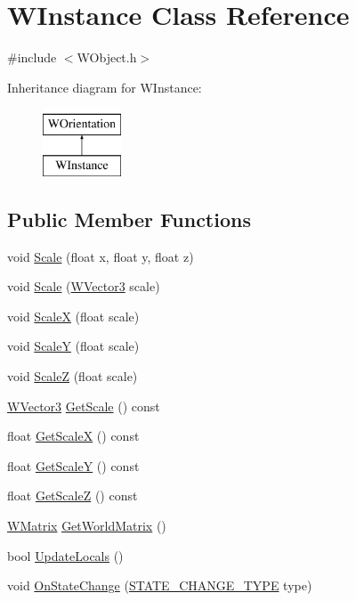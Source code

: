 \hypertarget{class_w_instance}{}\section{W\+Instance Class Reference}
\label{class_w_instance}


{\ttfamily \#include $<$W\+Object.\+h$>$}

Inheritance diagram for W\+Instance\+:\begin{figure}[H]
\begin{center}
\leavevmode
\includegraphics[height=2.000000cm]{class_w_instance}
\end{center}
\end{figure}
\subsection*{Public Member Functions}
\begin{DoxyCompactItemize}
\item 
void \hyperlink{class_w_instance_aa5805787cddfa9b07e2b5c945f8bdc47}{Scale} (float x, float y, float z)
\item 
void \hyperlink{class_w_instance_aac983d6b3507de1f9a97c603320d633f}{Scale} (\hyperlink{class_w_vector3}{W\+Vector3} scale)
\item 
void \hyperlink{class_w_instance_aa9fbf63a71d78a199e0b3facccbb1ad7}{ScaleX} (float scale)
\item 
void \hyperlink{class_w_instance_a0385d63300222ba93fea63748da532b5}{ScaleY} (float scale)
\item 
void \hyperlink{class_w_instance_a5d9dababc48b4d9d2da5abbd3e37e2bb}{ScaleZ} (float scale)
\item 
\hyperlink{class_w_vector3}{W\+Vector3} \hyperlink{class_w_instance_a71da0f88552efb188071756d60f55184}{Get\+Scale} () const 
\item 
float \hyperlink{class_w_instance_a99fcf062ff407173e0084442843149f1}{Get\+ScaleX} () const 
\item 
float \hyperlink{class_w_instance_ae0591cf821d8965b94e9d09d6fd829af}{Get\+ScaleY} () const 
\item 
float \hyperlink{class_w_instance_a924f7ce994f009850174f22a92be686c}{Get\+ScaleZ} () const 
\item 
\hyperlink{class_w_matrix}{W\+Matrix} \hyperlink{class_w_instance_a9a7c34683f6ca07c4a337264bb84d4cc}{Get\+World\+Matrix} ()
\item 
bool \hyperlink{class_w_instance_ae3c1714ea89b18160cc282dcd6476d14}{Update\+Locals} ()
\item 
void \hyperlink{class_w_instance_a30c34ae4cf3146852c9d35eeef993118}{On\+State\+Change} (\hyperlink{_w_orientation_8h_afe94de0a48bbd7b343ab18bc318cef28}{S\+T\+A\+T\+E\+\_\+\+C\+H\+A\+N\+G\+E\+\_\+\+T\+Y\+PE} type)
\end{DoxyCompactItemize}
